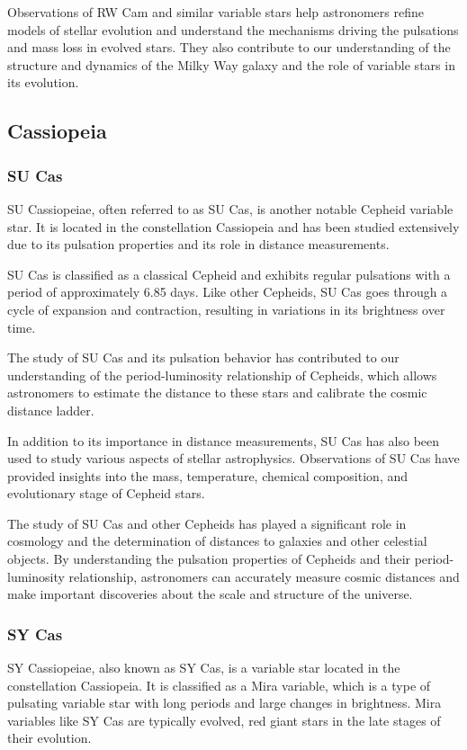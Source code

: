 Observations of RW Cam and similar variable stars help astronomers refine models of stellar evolution and understand the mechanisms driving the pulsations and mass loss in evolved stars. They also contribute to our understanding of the structure and dynamics of the Milky Way galaxy and the role of variable stars in its evolution.


\subsection{Cassiopeia}
\subsubsection*{SU Cas}
SU Cassiopeiae, often referred to as SU Cas, is another notable Cepheid variable star. It is located in the constellation Cassiopeia and has been studied extensively due to its pulsation properties and its role in distance measurements.

SU Cas is classified as a classical Cepheid and exhibits regular pulsations with a period of approximately 6.85 days. Like other Cepheids, SU Cas goes through a cycle of expansion and contraction, resulting in variations in its brightness over time.

The study of SU Cas and its pulsation behavior has contributed to our understanding of the period-luminosity relationship of Cepheids, which allows astronomers to estimate the distance to these stars and calibrate the cosmic distance ladder.

In addition to its importance in distance measurements, SU Cas has also been used to study various aspects of stellar astrophysics. Observations of SU Cas have provided insights into the mass, temperature, chemical composition, and evolutionary stage of Cepheid stars.

The study of SU Cas and other Cepheids has played a significant role in cosmology and the determination of distances to galaxies and other celestial objects. By understanding the pulsation properties of Cepheids and their period-luminosity relationship, astronomers can accurately measure cosmic distances and make important discoveries about the scale and structure of the universe.

\subsubsection*{ SY Cas }
SY Cassiopeiae, also known as SY Cas, is a variable star located in the constellation Cassiopeia. It is classified as a Mira variable, which is a type of pulsating variable star with long periods and large changes in brightness. Mira variables like SY Cas are typically evolved, red giant stars in the late stages of their evolution.

